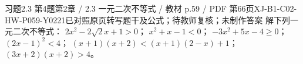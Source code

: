 \par\noindent\begin{minipage}{\linewidth}
\begin{bankitem}{习题2.3 第4题}{第2章 / 2.3 一元二次不等式 / 教材 p.59 / PDF 第66页}{XJ-B1-C02-HW-P059-Y0221}{已对照原页转写题干及公式；待教师复核；未制作答案}
解下列一元二次不等式：
$2x^2-2\sqrt2x+1>0$；
$x^2+x-1<0$；
$-3x^2+5x-4\ge0$；
$(2x-1)^2<4$；
$(x+1)(x+2)<(x+1)(2-x)+1$；
$(3x+2)(x+2)>4$。
\end{bankitem}
\end{minipage}\par\medskip
